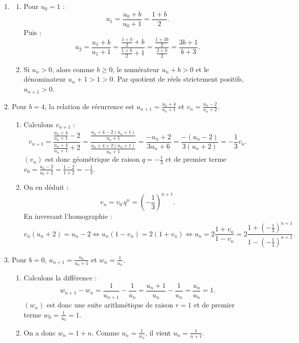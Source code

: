 \documentclass[11pt,a4paper]{article}
\begin{document}
\begin{correctionbox}
\begin{enumerate}
    \item
    \begin{enumerate}
        \item Pour $u_0 = 1$ :
        \[
        u_1 = \frac{u_0 + b}{u_0 + 1} = \frac{1+b}{2}.
        \]
        Puis :
        \[
        u_2 = \frac{u_1 + b}{u_1 + 1} = \frac{\frac{1+b}{2} + b}{\frac{1+b}{2} + 1} = \frac{\frac{1+3b}{2}}{\frac{3+b}{2}} = \frac{3b+1}{b+3}.
        \]
        \item Si $u_n > 0$, alors comme $b \ge 0$, le numérateur $u_n + b > 0$ et le dénominateur $u_n + 1 > 1 > 0$. Par quotient de réels strictement positifs, $u_{n+1} > 0$.
    \end{enumerate}
    \item Pour $b=4$, la relation de récurrence est $u_{n+1} = \frac{u_n + 4}{u_n + 1}$ et $v_n = \frac{u_n - 2}{u_n + 2}$.
    \begin{enumerate}
        \item Calculons $v_{n+1}$ :
        \[
        v_{n+1} = \frac{\frac{u_n+4}{u_n+1} - 2}{\frac{u_n+4}{u_n+1} + 2} = \frac{\frac{u_n+4 - 2(u_n+1)}{u_n+1}}{\frac{u_n+4 + 2(u_n+1)}{u_n+1}} = \frac{-u_n + 2}{3u_n + 6} = \frac{-(u_n - 2)}{3(u_n + 2)} = -\frac{1}{3} v_n.
        \]
        $(v_n)$ est donc géométrique de raison $q = -\frac{1}{3}$ et de premier terme $v_0 = \frac{u_0 - 2}{u_0 + 2} = \frac{1-2}{1+2} = -\frac{1}{3}$.
        \item On en déduit :
        \[
        v_n = v_0 \, q^n = \left(-\frac{1}{3}\right)^{n+1}.
        \]
        En inversant l'homographie :
        \[
        v_n (u_n + 2) = u_n - 2 \iff u_n (1 - v_n) = 2(1 + v_n) \iff u_n = 2 \frac{1 + v_n}{1 - v_n} = 2 \frac{1 + \left(-\frac{1}{3}\right)^{n+1}}{1 - \left(-\frac{1}{3}\right)^{n+1}}.
        \]
    \end{enumerate}
    \item Pour $b=0$, $u_{n+1} = \frac{u_n}{u_n+1}$ et $w_n = \frac{1}{u_n}$.
    \begin{enumerate}
        \item Calculons la différence :
        \[
        w_{n+1} - w_n = \frac{1}{u_{n+1}} - \frac{1}{u_n} = \frac{u_n+1}{u_n} - \frac{1}{u_n} = \frac{u_n}{u_n} = 1.
        \]
        $(w_n)$ est donc une suite arithmétique de raison $r=1$ et de premier terme $w_0 = \frac{1}{u_0} = 1$.
        \item On a donc $w_n = 1 + n$. Comme $u_n = \frac{1}{w_n}$, il vient $u_n = \frac{1}{n+1}$.

\end{enumerate}
\end{enumerate}
\end{correctionbox}
\end{document}
